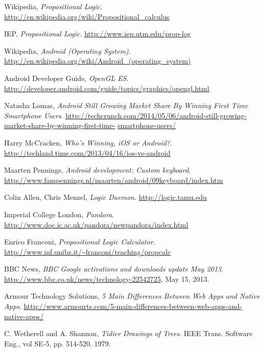 \documentclass{report}
\begin{document}
\begin{thebibliography}{9}

  Wikipedia,
  \emph{Propositional Logic}.
  \url{http://en.wikipedia.org/wiki/Propositional_calculus}

  IEP,
  \emph{Propositional Logic}.
  \url{http://www.iep.utm.edu/prop-log}

  Wikipedia,
  \emph{Android (Operating System)}.
  \url{http://en.wikipedia.org/wiki/Android_(operating_system)}

  Android Developer Guide,
  \emph{OpenGL ES}.
  \url{http://developer.android.com/guide/topics/graphics/opengl.html}

  Natasha Lomas,
  \emph{Android Still Growing Market Share By Winning First Time Smartphone Users}.
  \url{http://techcrunch.com/2014/05/06/android-still-growing-market-share-by-winning-first-time-}
  \url{smartphone-users/}

  Harry McCracken,
  \emph{Who’s Winning, iOS or Android?}.
  \url{http://techland.time.com/2013/04/16/ios-vs-android}

  Maarten Pennings,
  \emph{Android development: Custom keyboard}.
  \url{http://www.fampennings.nl/maarten/android/09keyboard/index.htm}

  Colin Allen, Chris Menzel,
  \emph{Logic Daemon}.
  \url{http://logic.tamu.edu}

  Imperial College London,
  \emph{Pandora}.
  \url{http://www.doc.ic.ac.uk/pandora/newpandora/index.html}

  Enrico Franconi,
  \emph{Propositional Logic Calculator}.
  \url{http://www.inf.unibz.it/~franconi/teaching/propcalc}

  BBC News,
  \emph{BBC Google activations and downloads update May 2013}. 
  \url{http://www.bbc.co.uk/news/technology-22542725},
  May 15, 2013.

  Armour Technology Solutions,
  \emph{5 Main Differences Between Web Apps and Native Apps}.
  \url{http://www.armourts.com/5-main-differences-between-web-apps-and-native-apps/}

  C. Wetherell and A. Shannon,
  \emph{Tidier Drawings of Trees}.
  IEEE Trans. Software Eng., 
  vol SE-5, pp. 514-520.
  1979.


\end{thebibliography}
\end{document}
